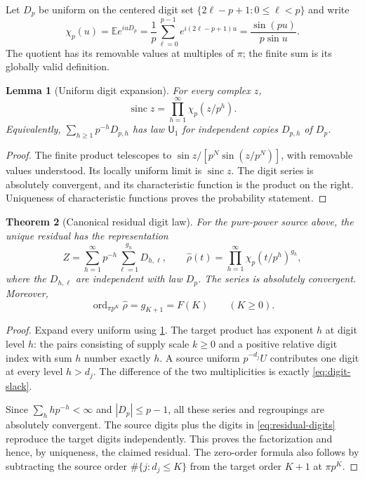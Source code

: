 \documentclass[11pt,a4paper]{article}
\newtheorem{theorem}{Theorem}[section]
\newtheorem{lemma}[theorem]{Lemma}
\theoremstyle{remark}
\newcommand{\E}{\mathbb E}
\newcommand{\sinc}{\operatorname{sinc}}
\newcommand{\ord}{\operatorname{ord}}
\newcommand{\Unif}{\mathsf U}
\newcommand{\cf}[1]{\widehat{#1}}
\begin{document}
Let $D_p$ be uniform on the centered digit set
$\{2\ell-p+1:0\le\ell<p\}$ and write
\begin{equation}
 \chi_p(u)=\E e^{iuD_p}
 =\frac1p\sum_{\ell=0}^{p-1}e^{i(2\ell-p+1)u}
 =\frac{\sin(pu)}{p\sin u}.
 \label{eq:digit-char}
\end{equation}
The quotient has its removable values at multiples of $\pi$; the finite sum
is its globally valid definition.

\begin{lemma}[Uniform digit expansion]
\label{lem:uniform-digits}
For every complex $z$,
\begin{equation}
 \sinc z=\prod_{h=1}^{\infty}\chi_p(z/p^h).
 \label{eq:uniform-digits}
\end{equation}
Equivalently, $\sum_{h\ge1}p^{-h}D_{p,h}$ has law $\Unif_1$ for independent
copies $D_{p,h}$ of $D_p$.
\end{lemma}
\begin{proof}
The finite product telescopes to
$\sin z/[p^N\sin(z/p^N)]$, with removable values understood. Its locally
uniform limit is $\sinc z$. The digit series is absolutely convergent, and
its characteristic function is the product on the right. Uniqueness of
characteristic functions proves the probability statement.
\end{proof}

\begin{theorem}[Canonical residual digit law]
\label{thm:digits}
For the pure-power source above, the unique residual has the representation
\begin{equation}
 Z=\sum_{h=1}^{\infty}p^{-h}\sum_{\ell=1}^{g_h}D_{h,\ell},
 \qquad
 \cf\rho(t)=\prod_{h=1}^{\infty}\chi_p(t/p^h)^{g_h},
 \label{eq:residual-digits}
\end{equation}
where the $D_{h,\ell}$ are independent with law $D_p$.
The series is absolutely convergent. Moreover,
\begin{equation}
 \ord_{\pi p^K}\cf\rho=g_{K+1}=F(K)\qquad(K\ge0).
 \label{eq:slack-zeros}
\end{equation}
\end{theorem}
\begin{proof}
Expand every uniform using \cref{lem:uniform-digits}. The target product has
exponent $h$ at digit level $h$: the pairs consisting of supply scale $k\ge0$
and a positive relative digit index with sum $h$ number exactly $h$.
A source uniform $p^{-d_j}U$ contributes one digit at every level $h>d_j$.
The difference of the two multiplicities is exactly \eqref{eq:digit-slack}.

Since $\sum_h h p^{-h}<\infty$ and $|D_p|\le p-1$, all these series and
regroupings are absolutely convergent. The source digits plus the digits
in \eqref{eq:residual-digits} reproduce the target digits independently.
This proves the factorization and hence, by uniqueness, the claimed residual.
The zero-order formula also follows by subtracting the source order
$\#\{j:d_j\le K\}$ from the target order $K+1$ at $\pi p^K$.
\end{proof}
\end{document}
